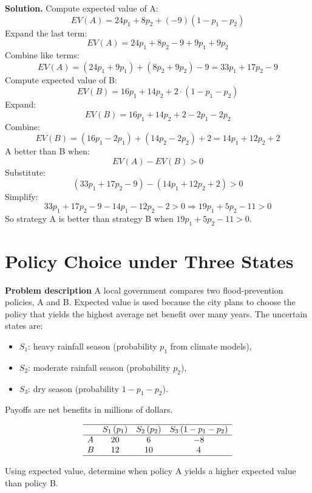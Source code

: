 \begin{ExamProblems}
		\textbf{Solution.}
		Compute expected value of A:
		\[
		EV(A)=24p_1 + 8p_2 + (-9)(1-p_1-p_2)
		\]
		Expand the last term:
		\[
		EV(A)=24p_1 + 8p_2 -9 + 9p_1 + 9p_2
		\]
		Combine like terms:
		\[
		EV(A)=(24p_1+9p_1) + (8p_2+9p_2) - 9 = 33p_1 + 17p_2 - 9
		\]
		Compute expected value of B:
		\[
		EV(B)=16p_1 + 14p_2 + 2\cdot(1-p_1-p_2)
		\]
		Expand:
		\[
		EV(B)=16p_1 + 14p_2 + 2 - 2p_1 - 2p_2
		\]
		Combine:
		\[
		EV(B)=(16p_1-2p_1) + (14p_2-2p_2) + 2 = 14p_1 + 12p_2 + 2
		\]
		A better than B when:
		\[
		EV(A)-EV(B)>0
		\]
		Substitute:
		\[
		(33p_1+17p_2-9)-(14p_1+12p_2+2)>0
		\]
		Simplify:
		\[
		33p_1+17p_2-9-14p_1-12p_2-2>0
		\Rightarrow 19p_1+5p_2-11>0
		\]
		So strategy A is better than strategy B when \(19p_1+5p_2-11>0\).
		
		
		\hypertarget{c7-ex6}{}
		\item
		\section{Policy Choice under Three States}
		
		\textbf{Problem description}
		A local government compares two flood-prevention policies, A and B. Expected value is used because the city plans to choose the policy that yields the highest average net benefit over many years. The uncertain states are:
		\begin{itemize}
			\item \(S_1\): heavy rainfall season (probability \(p_1\) from climate models),
			\item \(S_2\): moderate rainfall season (probability \(p_2\)),
			\item \(S_3\): dry season (probability \(1-p_1-p_2\)).
		\end{itemize}
		Payoffs are net benefits in millions of dollars.
		
		\[
		\begin{array}{lccc}
			\hline
			& S_1\,(p_1) & S_2\,(p_2) & S_3\,(1-p_1-p_2) \\
			\hline
			A & 20 & 6 & -8 \\
			B & 12 & 10 & 4 \\
			\hline
		\end{array}
		\]
		
		Using expected value, determine when policy A yields a higher expected value than policy B.
		

\end{ExamProblems}
